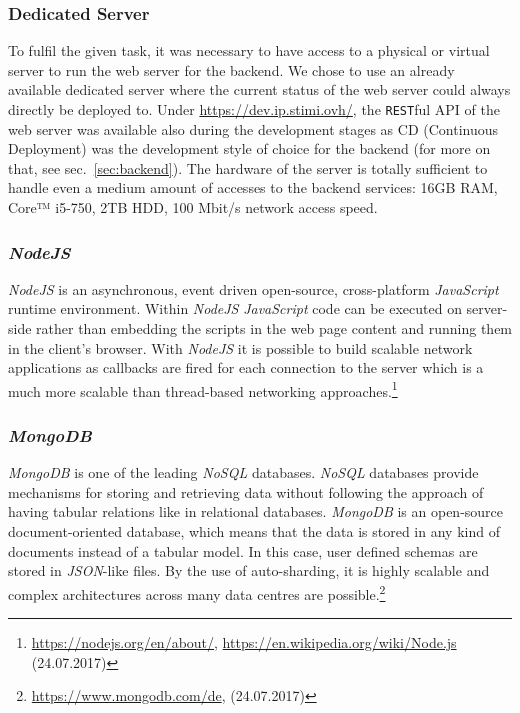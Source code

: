 
\subsubsection{Dedicated Server}
\label{subsubsec:dedicatedserver}
To fulfil the given task, it was necessary to have access to a physical or virtual server to run the web server for the backend. We chose to use an already available dedicated server where the current status of the web server could always directly be deployed to. Under \url{https://dev.ip.stimi.ovh/}, the \texttt{REST}ful API of the web server was available also during the development stages as CD (Continuous Deployment) was the development style of choice for the backend (for more on that, see sec.\ \ref{sec:backend}). \newline
The hardware of the server is totally sufficient to handle even a medium amount of accesses to the backend services: 16GB RAM, Core™ i5-750, 2TB HDD, 100 Mbit/s network access speed.

\subsubsection{\textit{NodeJS}}
\label{subsubsec:nodejs}
\textit{NodeJS} is an asynchronous, event driven open-source, cross-platform \textit{JavaScript} runtime environment. Within \textit{NodeJS} \textit{JavaScript} code can be executed on server-side rather than embedding the scripts in the web page content and running them in the client's browser. With \textit{NodeJS} it is possible to build scalable network applications as callbacks are fired for each connection to the server which is a much more scalable than thread-based networking approaches.\footnote{\url{https://nodejs.org/en/about/}, \url{https://en.wikipedia.org/wiki/Node.js} (24.07.2017)}

\subsubsection{\textit{MongoDB}}
\label{subsubsec:mongodb}
\textit{MongoDB} is one of the leading \textit{NoSQL} databases. \textit{NoSQL} databases provide mechanisms for storing and retrieving data without following the approach of having tabular relations like in relational databases. \textit{MongoDB} is an open-source document-oriented database, which means that the data is stored in any kind of documents instead of a tabular model. In this case, user defined schemas are stored in \textit{JSON}-like files. By the use of auto-sharding, it is highly scalable and complex architectures across many data centres are possible.\footnote{\url{https://www.mongodb.com/de}, (24.07.2017)}


